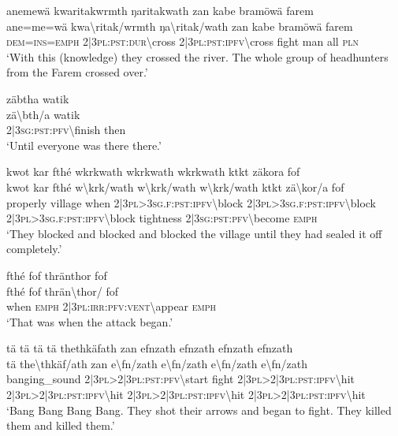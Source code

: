 \ea\label{ex:5:a1559}
anemewä kwaritakwrmth ŋaritakwath zan kabe bramöwä farem\\
\gll ane=me=wä	kwa{\textbackslash}ritak/wrmth	ŋa{\textbackslash}ritak/wath	zan	kabe	bramöwä	farem\\
     \textsc{dem}=\textsc{ins}=\textsc{emph}	2|3\textsc{pl}:\textsc{pst}:\textsc{dur}{\textbackslash}cross	2|3\textsc{pl}:\textsc{pst}:\textsc{ipfv}{\textbackslash}cross	fight	man	all	\textsc{pln}\\
\glt `With this (knowledge) they crossed the river. The whole group of headhunters from the Farem crossed over.'
\z

\newpage
\ea\label{ex:5:a1560}
zäbtha watik\\
\gll zä{\textbackslash}bth/a	watik\\
     2|3\textsc{sg}:\textsc{pst}:\textsc{pfv}{\textbackslash}finish	then\\
\glt `Until everyone was there there.'
\z

\ea\label{ex:5:a1561}
kwot kar fthé wkrkwath wkrkwath wkrkwath ktkt zäkora fof\\
\gll kwot	kar	fthé	w{\textbackslash}krk/wath	w{\textbackslash}krk/wath	w{\textbackslash}krk/wath	ktkt	zä{\textbackslash}kor/a	fof\\
     properly	village	when	2|3\textsc{pl}>3\textsc{sg}.\textsc{f}:\textsc{pst}:\textsc{ipfv}{\textbackslash}block	2|3\textsc{pl}>3\textsc{sg}.\textsc{f}:\textsc{pst}:\textsc{ipfv}{\textbackslash}block	2|3\textsc{pl}>3\textsc{sg}.\textsc{f}:\textsc{pst}:\textsc{ipfv}{\textbackslash}block	tightness	2|3\textsc{sg}:\textsc{pst}:\textsc{pfv}{\textbackslash}become	\textsc{emph}\\
\glt `They blocked and blocked and blocked the village until they had sealed it off completely.'
\z

\ea\label{ex:5:a1562}
fthé fof thränthor fof\\
\gll fthé	fof	thrän{\textbackslash}thor/	fof\\
     when	\textsc{emph}	2|3\textsc{pl}:\textsc{irr}:\textsc{pfv}:\textsc{vent}{\textbackslash}appear	\textsc{emph}\\
\glt `That was when the attack began.'
\z

\ea\label{ex:5:a1563}
tä tä tä tä thethkäfath zan efnzath efnzath efnzath efnzath\\
\gll tä the{\textbackslash}thkäf/ath	zan	e{\textbackslash}fn/zath	e{\textbackslash}fn/zath	e{\textbackslash}fn/zath	e{\textbackslash}fn/zath\\
     banging\_sound    2|3\textsc{pl}>2|3\textsc{pl}:\textsc{pst}:\textsc{pfv}{\textbackslash}start	fight	2|3\textsc{pl}>2|3\textsc{pl}:\textsc{pst}:\textsc{ipfv}{\textbackslash}hit	2|3\textsc{pl}>2|3\textsc{pl}:\textsc{pst}:\textsc{ipfv}{\textbackslash}hit	2|3\textsc{pl}>2|3\textsc{pl}:\textsc{pst}:\textsc{ipfv}{\textbackslash}hit	2|3\textsc{pl}>2|3\textsc{pl}:\textsc{pst}:\textsc{ipfv}{\textbackslash}hit\\
\glt `Bang Bang Bang Bang. They shot their arrows and began to fight. They killed them and killed them.'
\z

